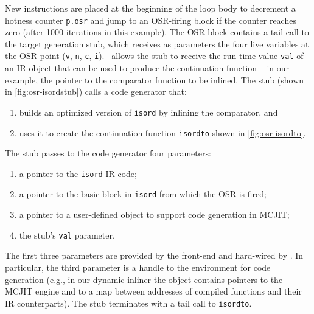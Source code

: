 \noindent New instructions are placed at the beginning of the loop body to decrement a hotness counter {\tt p.osr} and jump to an OSR-firing block if the counter reaches zero (after 1000 iterations in this example). The OSR block contains a tail call to the target generation stub, which receives as parameters the four live variables at the OSR point ({\tt v}, {\tt n}, {\tt c}, {\tt i}). \osrkit\ allows the stub to receive the run-time value {\tt val} of an IR object that can be used to produce the continuation function -- in our example, the pointer to the comparator function to be inlined. The stub (shown in \myfigure\ref{fig:osr-isordstub}) calls a code generator that:
\begin{enumerate}[parsep=0pt,itemsep=3pt]
 \item builds an optimized version of {\tt isord} by inlining the comparator, and
 \item uses it to create the continuation function {\tt isordto} shown in \myfigure\ref{fig:osr-isordto}.
\end{enumerate}

\noindent The stub passes to the code generator four parameters:
\begin{enumerate}[parsep=0pt,itemsep=3pt]
 \item a pointer to the {\tt isord} IR code;
 \item a pointer to the basic block in {\tt isord} from which the OSR is fired;
 \item a pointer to a user-defined object to support code generation in MCJIT;
 \item the stub's {\tt val} parameter.
\end{enumerate}

\noindent The first three parameters are provided by the front-end and hard-wired by \osrkit. In particular, the third parameter is a handle to the environment for code generation (e.g., in our dynamic inliner the object contains pointers to the MCJIT engine and to a map between addresses of compiled functions and their IR counterparts). The stub terminates with a tail call to {\tt isordto}.

